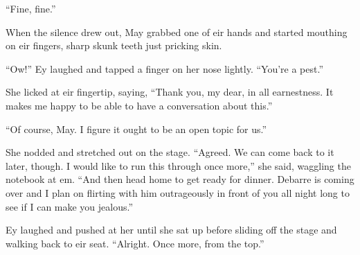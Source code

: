 ``Fine, fine.''

When the silence drew out, May grabbed one of eir hands and started mouthing on eir fingers, sharp skunk teeth just pricking skin.

``Ow!'' Ey laughed and tapped a finger on her nose lightly. ``You're a pest.''

She licked at eir fingertip, saying, ``Thank you, my dear, in all earnestness. It makes me happy to be able to have a conversation about this.''

``Of course, May. I figure it ought to be an open topic for us.''

She nodded and stretched out on the stage. ``Agreed. We can come back to it later, though. I would like to run this through once more,'' she said, waggling the notebook at em. ``And then head home to get ready for dinner. Debarre is coming over and I plan on flirting with him outrageously in front of you all night long to see if I can make you jealous.''

Ey laughed and pushed at her until she sat up before sliding off the stage and walking back to eir seat. ``Alright. Once more, from the top.''
